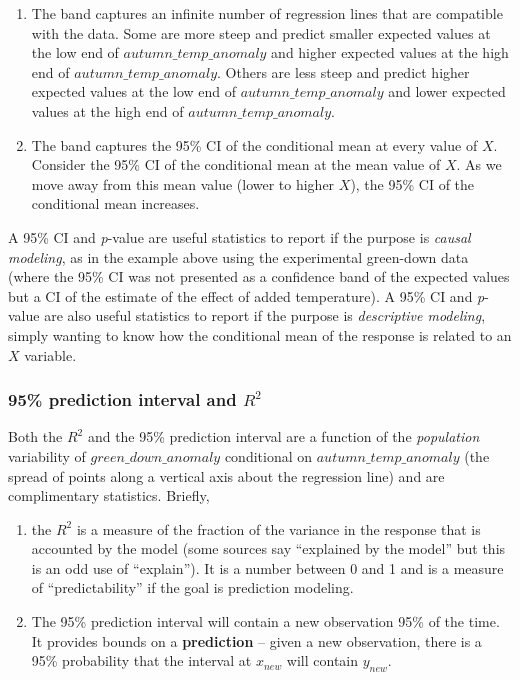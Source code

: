 \documentclass[]{book}
\providecommand{\tightlist}{%
  \setlength{\itemsep}{0pt}\setlength{\parskip}{0pt}}
\begin{document}
\begin{enumerate}
\def\labelenumi{\arabic{enumi}.}
\tightlist
\item
  The band captures an infinite number of regression lines that are compatible with the data. Some are more steep and predict smaller expected values at the low end of \(autumn\_temp\_anomaly\) and higher expected values at the high end of \(autumn\_temp\_anomaly\). Others are less steep and predict higher expected values at the low end of \(autumn\_temp\_anomaly\) and lower expected values at the high end of \(autumn\_temp\_anomaly\).
\item
  The band captures the 95\% CI of the conditional mean at every value of \(X\). Consider the 95\% CI of the conditional mean at the mean value of \(X\). As we move away from this mean value (lower to higher \(X\)), the 95\% CI of the conditional mean increases.
\end{enumerate}

A 95\% CI and \emph{p}-value are useful statistics to report if the purpose is \emph{causal modeling}, as in the example above using the experimental green-down data (where the 95\% CI was not presented as a confidence band of the expected values but a CI of the estimate of the effect of added temperature). A 95\% CI and \emph{p}-value are also useful statistics to report if the purpose is \emph{descriptive modeling}, simply wanting to know how the conditional mean of the response is related to an \(X\) variable.

\hypertarget{prediction-interval-and-r2}{%
\subsubsection{\texorpdfstring{95\% prediction interval and \(R^2\)}{95\% prediction interval and R\^{}2}}\label{prediction-interval-and-r2}}

Both the \(R^2\) and the 95\% prediction interval are a function of the \emph{population} variability of \(green\_down\_anomaly\) conditional on \(autumn\_temp\_anomaly\) (the spread of points along a vertical axis about the regression line) and are complimentary statistics. Briefly,

\begin{enumerate}
\def\labelenumi{\arabic{enumi}.}
\tightlist
\item
  the \(R^2\) is a measure of the fraction of the variance in the response that is accounted by the model (some sources say ``explained by the model'' but this is an odd use of ``explain''). It is a number between 0 and 1 and is a measure of ``predictability'' if the goal is prediction modeling.
\item
  The 95\% prediction interval will contain a new observation 95\% of the time. It provides bounds on a \textbf{prediction} -- given a new observation, there is a 95\% probability that the interval at \(x_{new}\) will contain \(y_{new}\).
\end{enumerate}
\end{document}
